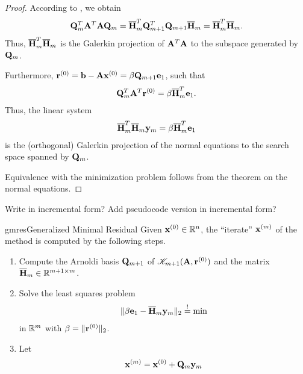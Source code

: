 \begin{proof}
  According to , we obtain
  \begin{gather}
    \mathbf Q_m^T\mathbf A^T\mathbf A\mathbf Q_m
    = \overline{\mathbf H}_m^T \mathbf Q_{m+1}^T\mathbf Q_{m+1}\overline{\mathbf H}_m
    = \overline{\mathbf H}_m^T\overline{\mathbf H}_m.
  \end{gather}
  Thus, $\overline{\mathbf H}_m^T\overline{\mathbf H}_m$ is the Galerkin
  projection of $\mathbf A^T\mathbf A$ to the subspace generated by
  $\mathbf Q_m$.

  Furthermore,
  $\mathbf r^{(0)} = \mathbf b-\mathbf A\mathbf x^{(0)} = \beta\mathbf Q_{m+1}\mathbf e_1$, such that
  \begin{gather}
    \mathbf Q_m^T\mathbf A^T\mathbf r^{(0)} = \beta\overline{\mathbf H}_m^T \mathbf e_1.
  \end{gather}
  Thus, the linear system
  \begin{gather}
    \overline{\mathbf H}_m^T\overline{\mathbf H}_m \mathbf y_m = \beta\overline{\mathbf H}_m^T \mathbf e_1
  \end{gather}
  is the (orthogonal) Galerkin projection of the normal equations to
  the search space spanned by $\mathbf Q_m$.

  Equivalence with the minimization problem follows from the theorem
  on the normal equations.
\end{proof}

\begin{todo}
  Write in incremental form? Add pseudocode version in incremental form?
\end{todo}

\begin{Algorithm*}{gmres}{Generalized Minimal Residual}
  Given $\mathbf x^{(0)}\in\mathbb R^n$, the ``iterate'' $\mathbf x^{(m)}$ of the
   method is computed by the following steps.
  \begin{enumerate}
  \item Compute the Arnoldi basis $\mathbf Q_{m+1}$ of
    $\mathscr K_{m+1}(\mathbf A,\mathbf r^{(0)})$ and the matrix $\overline{\mathbf H}_m\in\mathbb R^{m+1\times m}$.
  \item Solve the least squares problem
    \begin{gather}
      \lVert\beta\mathbf e_1 - \overline{\mathbf H}_m \mathbf y_m\rVert_2 \stackrel{!}{=} \min
    \end{gather}
    in $\mathbb R^m$ with $\beta = \lVert\mathbf r^{(0)}\rVert_2$.
  \item Let
    \begin{gather}
      \mathbf x^{(m)} = \mathbf x^{(0)} + \mathbf Q_{m}\mathbf y_m
    \end{gather}
  \end{enumerate}
\end{Algorithm*}

